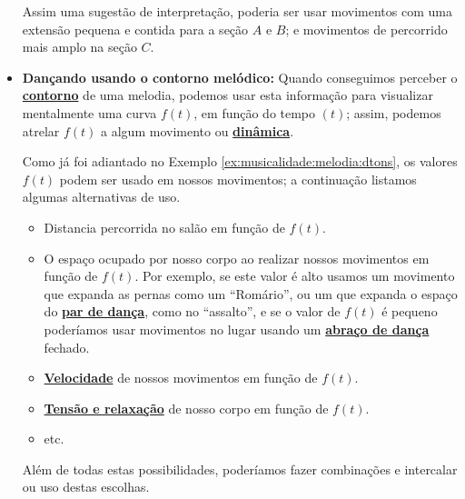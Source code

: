 \begin{itemize}
\begin{example}
Assim uma sugestão de interpretação, 
poderia ser usar movimentos com uma extensão pequena e contida para
a seção $A$ e $B$; e movimentos de percorrido mais amplo na seção $C$. 
\end{example}
\item \textbf{Dançando usando o contorno melódico:}
Quando conseguimos perceber o \hyperref[ref:melodica:shape]{\textbf{contorno}} de uma melodia,
podemos usar esta informação para visualizar mentalmente uma curva $f(t)$, em função do tempo $(t)$;
assim, podemos atrelar $f(t)$ a algum movimento ou \hyperref[sec:musicalidade:dinamicas]{\textbf{dinâmica}}.
\begin{example}
Como já foi adiantado no Exemplo \ref{ex:musicalidade:melodia:dtons},
 os valores $f(t)$ podem ser usado em nossos movimentos; 
a continuação listamos algumas alternativas de uso.
\begin{itemize}
\item Distancia percorrida no salão em função de $f(t)$.
\item O espaço ocupado por nosso corpo ao realizar nossos movimentos em função de $f(t)$.
Por exemplo, se este valor é alto usamos um movimento que expanda as pernas como um ``Romário'',
ou um que expanda o espaço do \hyperref[def:Par]{\textbf{par de dança}}, como no ``assalto'', 
e se o valor de $f(t)$ é pequeno poderíamos usar movimentos no lugar usando um 
\hyperref[def:abracodedanca]{\textbf{abraço de dança}} fechado. 
\item \hyperref[subsec:dinamica:velocidade]{\textbf{Velocidade}} de nossos movimentos em função de $f(t)$.
\item \hyperref[sec:musicalidadetensionrelease]{\textbf{Tensão e relaxação}} de nosso corpo em função de $f(t)$.
\item etc.
\end{itemize}

Além de todas estas possibilidades, poderíamos fazer combinações e intercalar ou uso  destas escolhas.
\end{example}


\end{itemize}
